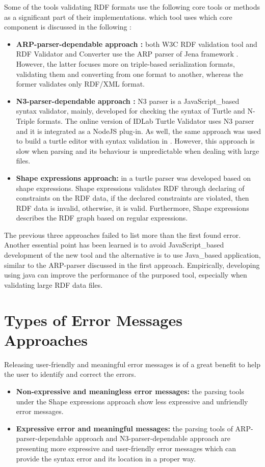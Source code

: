Some of the tools validating RDF formats use the following core tools or methods as a significant part of their implementations. which tool  uses which core component is discussed in the following : \begin{itemize}[noitemsep] 
	\item \textbf{ARP-parser-dependable approach :} both W3C RDF validation tool \cite{W3C:Validation:Online} and RDF Validator and Converter \cite{Mybluemix:Validation:Online} use the ARP parser of Jena framework \cite{McBride:2002:JSW:613357.613755}. However, the latter focuses more on triple-based serialization formats, validating them and converting from one format to another, whereas the former validates only RDF/XML format. 
	\item \textbf{N3-parser-dependable approach :} N3 parser \cite{N3Parser:Online} is a JavaScript\_based syntax validator, mainly, developed for checking the syntax of Turtle and N-Triple formats. The online version of IDLab Turtle Validator \cite{IDLab:Validation:Online} uses N3 parser and it is integrated as a NodeJS plug-in. As well, the same approach was used to build a turtle editor with syntax validation in \cite{petersenturtleeditor}. However, this approach is slow when parsing and its behaviour is unpredictable when dealing with large files. 
	\item \textbf{Shape expressions approach:} in \cite{prud2014shape} a turtle parser was developed based on shape expressions. Shape expressions validates RDF through declaring of constraints on the RDF data, if the declared constraints are violated, then RDF data is invalid, otherwise, it is valid. Furthermore, Shape expressions describes the RDF graph based on regular expressions. 
\end{itemize} 

The previous three approaches failed to list more than the first found error. Another essential point has been learned is to avoid JavaScript\_based development of the new tool and the alternative is to use Java\_based application, similar to the ARP-parser discussed in the first approach. Empirically, developing using java can improve the performance of the purposed tool, especially when  validating large RDF data files.

\section{Types of Error Messages Approaches}
Releasing user-friendly and meaningful error messages is of a great benefit to help the user to identify and correct the errors. 
\begin{itemize}
    \item \textbf{Non-expressive and meaningless error messages:} the parsing tools under the Shape expressions approach show less expressive  and unfriendly error messages.
    \item \textbf{Expressive error and meaningful  messages:} the parsing tools of ARP-parser-dependable approach and N3-parser-dependable approach  are presenting more expressive and user-friendly error messages which can provide the syntax error and its location in a proper way. 
    
\end{itemize}

